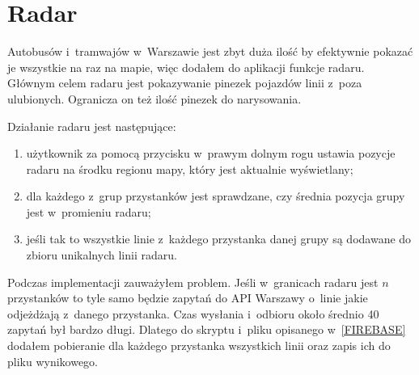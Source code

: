 \documentclass{SGGW-thesis}
\begin{document}
\label{RADAR}
\section{Radar}
Autobusów i~tramwajów w~Warszawie jest zbyt duża ilość by efektywnie pokazać je wszystkie na raz na mapie, więc dodałem do aplikacji funkcje radaru.
Głównym celem radaru jest pokazywanie pinezek pojazdów linii z~poza ulubionych.
Ogranicza on też ilość pinezek do narysowania.

Działanie radaru jest następujące:
\begin{enumerate}
  \item{użytkownik za pomocą przycisku w~prawym dolnym rogu ustawia pozycje radaru na środku regionu mapy, który jest aktualnie wyświetlany;}
  \item{dla każdego z~grup przystanków jest sprawdzane, czy średnia pozycja grupy jest w~promieniu radaru;}
  \item{jeśli tak to wszystkie linie z~każdego przystanka danej grupy są dodawane do zbioru unikalnych linii radaru.}
\end{enumerate}
Podczas implementacji zauważyłem problem.
Jeśli w~granicach radaru jest $n$ przystanków to tyle samo będzie zapytań do API Warszawy o~linie jakie odjeżdżają z~danego przystanka.
Czas wysłania i~odbioru około średnio 40 zapytań był bardzo długi.
Dlatego do skryptu i~pliku opisanego w~\ref{FIREBASE} dodałem pobieranie dla każdego przystanka wszystkich linii oraz zapis ich do pliku wynikowego.
\end{document}
